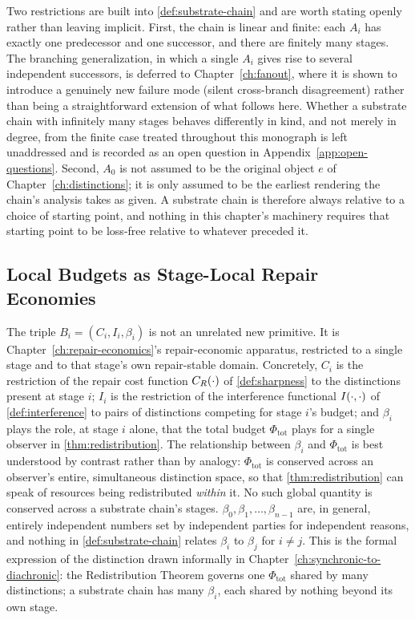 Two restrictions are built into \cref{def:substrate-chain} and are worth
stating openly rather than leaving implicit. First, the chain is linear
and finite: each $A_i$ has exactly one predecessor and one successor, and
there are finitely many stages. The branching generalization, in which a
single $A_i$ gives rise to several independent successors, is deferred to
Chapter~\ref{ch:fanout}, where it is shown to introduce a genuinely new
failure mode (silent cross-branch disagreement) rather than being a
straightforward extension of what follows here. Whether a substrate chain
with infinitely many stages behaves differently in kind, and not merely in
degree, from the finite case treated throughout this monograph is left
unaddressed and is recorded as an open question in
Appendix~\ref{app:open-questions}. Second, $A_0$ is not assumed to be the
original object $e$ of Chapter~\ref{ch:distinctions}; it is only assumed to
be the earliest rendering the chain's analysis takes as given. A substrate
chain is therefore always relative to a choice of starting point, and
nothing in this chapter's machinery requires that starting point to be
loss-free relative to whatever preceded it.

\subsection{Local Budgets as Stage-Local Repair Economies}

The triple $B_i = (C_i, I_i, \beta_i)$ is not an unrelated new primitive.
It is Chapter~\ref{ch:repair-economics}'s repair-economic apparatus,
restricted to a single stage and to that stage's own repair-stable domain.
Concretely, $C_i$ is the restriction of the repair cost function
$C_R(\cdot)$ of \cref{def:sharpness} to the distinctions present at
stage $i$; $I_i$ is the restriction of the interference functional
$I(\cdot,\cdot)$ of \cref{def:interference} to pairs of distinctions
competing for stage $i$'s budget; and $\beta_i$ plays the role, at stage
$i$ alone, that the total budget $\Phi_{\mathrm{tot}}$ plays for a single
observer in \cref{thm:redistribution}. The relationship between $\beta_i$
and $\Phi_{\mathrm{tot}}$ is best understood by contrast rather than by
analogy: $\Phi_{\mathrm{tot}}$ is conserved across an observer's entire,
simultaneous distinction space, so that \cref{thm:redistribution} can speak
of resources being redistributed \emph{within} it. No such global quantity
is conserved across a substrate chain's stages. $\beta_0, \beta_1, \ldots,
\beta_{n-1}$ are, in general, entirely independent numbers set by
independent parties for independent reasons, and nothing in
\cref{def:substrate-chain} relates $\beta_i$ to $\beta_j$ for $i \neq j$.
This is the formal expression of the distinction drawn informally in
Chapter~\ref{ch:synchronic-to-diachronic}: the Redistribution Theorem
governs one $\Phi_{\mathrm{tot}}$ shared by many distinctions; a substrate
chain has many $\beta_i$, each shared by nothing beyond its own stage.

